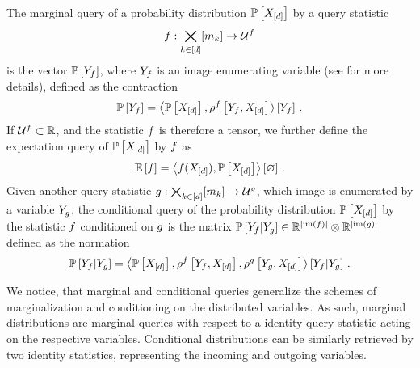 \begin{definition}
    \label{def:queries}
    The marginal query of a probability distribution $\mathbb{P}\left[X_{[d]}\right]$ by a query statistic
    \begin{align*}
        f : \bigtimes_{k\in[d]}[m_{k}] \rightarrow \mathcal{U}^{f}
    \end{align*}
    is the vector $\mathbb{P}\left[Y_{f}\right]$, where $Y_{f}$ is an image enumerating variable (see  for more details), defined as the contraction
    \begin{align*}
        \mathbb{P}\left[Y_{f}\right]
        = \left\langle \mathbb{P}\left[X_{[d]}\right],\rho^{f}\left[Y_{f},X_{[d]}\right]\right\rangle \left[ Y_{f} \right] \, .
    \end{align*}
    If $\mathcal{U}^{f}\subset\mathbb{R}$, and the statistic $f$ is therefore a tensor, we further define the expectation query of $\mathbb{P}\left[X_{[d]}\right]$ by $f$ as
    \begin{align*}
        \mathbb{E}\left[f\right] = \left\langle f(X_{[d]}),\mathbb{P}\left[X_{[d]}\right]\right\rangle \left[ \varnothing \right] \, .
    \end{align*}
    Given another query statistic $g: \bigtimes_{k\in[d]}[m_{k}] \rightarrow \mathcal{U}^{g}$, which image is enumerated by a variable $Y_{g}$, the conditional query of the probability distribution $\mathbb{P}\left[X_{[d]}\right]$ by the statistic $f$ conditioned on $g$ is the matrix $\mathbb{P}\left[Y_{f}|Y_{g}\right]\in\mathbb{R}^{\left|\mathrm{im}\left(f\right)\right|}\otimes \mathbb{R}^{\left|\mathrm{im}\left(g\right)\right|}$ defined as the normation
    \begin{align*}
        \mathbb{P}\left[Y_{f}|Y_{g}\right]
        = \left\langle 
            \mathbb{P}\left[X_{[d]}\right],\rho^{f}\left[Y_{f},X_{[d]}\right],\rho^{g}\left[Y_{g},X_{[d]}\right]
        \right\rangle \left[ 
            Y_{f} | Y_{g}
         \right] \, .
    \end{align*}
\end{definition}

We notice, that marginal and conditional queries generalize the schemes of marginalization and conditioning on the distributed variables.
As such, marginal distributions are marginal queries with respect to a identity query statistic acting on the respective variables.
Conditional distributions can be similarly retrieved by two identity statistics, representing the incoming and outgoing variables.

